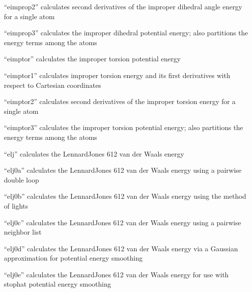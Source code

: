 \documentclass[letterpaper,11pt,english]{sphinxmanual}
\begin{document}

“eimprop2” calculates second derivatives of the improper
dihedral angle energy for a single atom


“eimprop3” calculates the improper dihedral potential
energy; also partitions the energy terms among the atoms


“eimptor” calculates the improper torsion potential energy


“eimptor1” calculates improper torsion energy and its
first derivatives with respect to Cartesian coordinates


“eimptor2” calculates second derivatives of the improper
torsion energy for a single atom


“eimptor3” calculates the improper torsion potential energy;
also partitions the energy terms among the atoms


“elj” calculates the Lennard\sphinxhyphen{}Jones 6\sphinxhyphen{}12 van der Waals energy


“elj0a” calculates the Lennard\sphinxhyphen{}Jones 6\sphinxhyphen{}12 van der Waals energy
using a pairwise double loop


“elj0b” calculates the Lennard\sphinxhyphen{}Jones 6\sphinxhyphen{}12 van der Waals energy
using the method of lights


“elj0c” calculates the Lennard\sphinxhyphen{}Jones 6\sphinxhyphen{}12 van der Waals energy
using a pairwise neighbor list


“elj0d” calculates the Lennard\sphinxhyphen{}Jones 6\sphinxhyphen{}12 van der Waals energy
via a Gaussian approximation for potential energy smoothing


“elj0e” calculates the Lennard\sphinxhyphen{}Jones 6\sphinxhyphen{}12 van der Waals energy
for use with stophat potential energy smoothing
\end{document}
